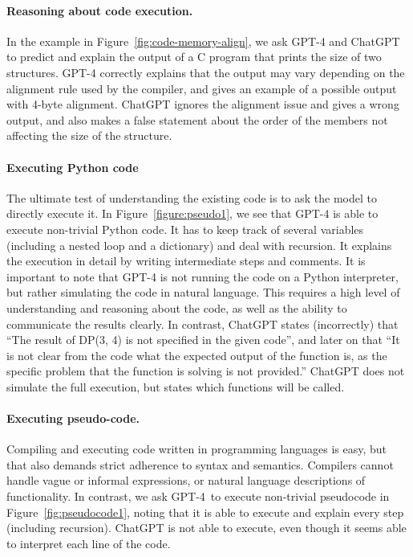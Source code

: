 \paragraph{Reasoning about code execution.} In the example in Figure~\ref{fig:code-memory-align}, we ask GPT-4 and ChatGPT to predict and explain the output of a C program that prints the size of two structures. GPT-4 correctly explains that the output may vary depending on the alignment rule used by the compiler, and gives an example of a possible output with 4-byte alignment. ChatGPT ignores the alignment issue and gives a wrong output, and also makes a false statement about the order of the members not affecting the size of the structure.

\paragraph{Executing Python code} The ultimate test of understanding the existing code is to ask the model to directly execute it. In Figure~\ref{figure:pseudo1}, we see that GPT-4 is able to execute non-trivial Python code. It has to keep track of several variables (including a nested loop and a dictionary) and deal with recursion. It explains the execution in detail by writing intermediate steps and comments. It is important to note that GPT-4 is not running the code on a Python interpreter, but rather simulating the code in natural language. This requires a high level of understanding and reasoning about the code, as well as the ability to communicate the results clearly. In contrast, ChatGPT states (incorrectly) that ``The result of DP(3, 4) is not specified in the given code'', and later on that ``It is not clear from the code what the expected output of the function is, as the specific problem that the function is solving is not provided.'' ChatGPT does not simulate the full execution, but states which functions will be called. 

\paragraph{Executing pseudo-code.} Compiling and executing code written in programming languages is easy, but that also demands strict adherence to syntax and semantics. Compilers cannot handle vague or informal expressions, or natural language descriptions of functionality. In contrast, we ask GPT-4\ to execute non-trivial pseudocode in Figure~\ref{fig:pseudocode1}, noting that it is able to execute and explain every step (including recursion). ChatGPT is not able to execute, even though it seems able to interpret each line of the code.

